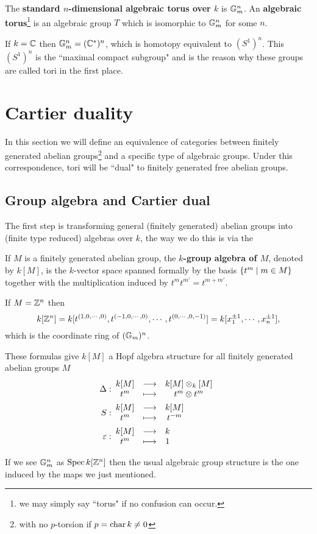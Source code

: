 \begin{definition}
The \textbf{standard $n$-dimensional algebraic torus over $k$} is $\mathbb{G}_m^n$. An \textbf{algebraic torus}\footnote{we may simply say ``torus" if no confusion can occur.} is an algebraic group $T$ which is isomorphic to $\mathbb{G}_m^n$ for some $n$.
\end{definition}

\begin{remark}
If $k=\mathbb{C}$ then $\mathbb{G}_m^n=(\mathbb{C}^\ast)^n$, which is homotopy equivalent to $(S^1)^n$. This $(S^1)^n$ is the ``maximal compact subgroup" and is the reason why these groups are called tori in the first place.
\end{remark}


\section{Cartier duality}
In this section we will define an equivalence of categories between finitely generated abelian groups\footnote{with no $p$-torsion if $p=\operatorname{char} k\neq 0$} and a specific type of algebraic groups.
Under this correspondence, tori will be ``dual" to finitely generated free abelian groups.

\subsection{Group algebra and Cartier dual}
The first step is transforming general (finitely generated) abelian groups into (finite type reduced) algebras over $k$, the way we do this is via the

\begin{definition}
If $M$ is a finitely generated abelian group, the \textbf{$k$-group algebra of $M$}, denoted by $k[M]$, is the $k$-vector space spanned formally by the basis $\left\{{t^m\mid m\in M}\right\}$ together with the multiplication induced by $t^mt^{m'}=t^{m+m'}$.
\end{definition}

\begin{example}
If $M=\mathbb{Z}^n$ then
\[k[\mathbb{Z}^n]=k[t^{(1,0,\cdots,0)}, t^{(-1,0,\cdots,0)},\cdots,t^{(0,\cdots,0,-1)}]=k[x_1^{\pm1},\cdots,x_n^{\pm1}],\]
which is the coordinate ring of $(\mathbb{G}_m)^n$.
\end{example}

\begin{fact}
These formulas give $k[M]$ a Hopf algebra structure for all finitely generated abelian groups $M$
\begin{align*}
\Delta:&\begin{array}{ccc} {k[M]} & \longrightarrow & {k[M]\otimes_k[M]}\\ {t^m} & \longmapsto & {t^m\otimes t^m} \end{array}\\
S:&\begin{array}{ccc} {k[M]} & \longrightarrow & {k[M]}\\ {t^m} & \longmapsto & {t^{-m}} \end{array}\\
\varepsilon:&\begin{array}{ccc} {k[M]} & \longrightarrow & {k}\\ {t^m} & \longmapsto & {1} \end{array}
\end{align*}
\end{fact}
\begin{remark}
If we see $\mathbb{G}_m^n$ as $\operatorname{Spec} k[\mathbb{Z}^n]$ then the usual algebraic group structure is the one induced by the maps we just mentioned.
\end{remark}

